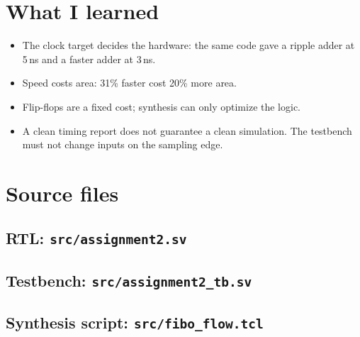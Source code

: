 \documentclass[11pt,a4paper]{article}
\begin{document}
\section{What I learned}
\begin{itemize}
\item The clock target decides the hardware: the same code gave a ripple adder at 5\,ns and a faster adder at 3\,ns.
\item Speed costs area: 31\% faster cost 20\% more area.
\item Flip-flops are a fixed cost; synthesis can only optimize the logic.
\item A clean timing report does not guarantee a clean simulation. The testbench must not change inputs on the sampling edge.
\end{itemize}

\appendix
\section{Source files}
\subsection*{RTL: \texttt{src/assignment2.sv}}

\subsection*{Testbench: \texttt{src/assignment2\_tb.sv}}

\subsection*{Synthesis script: \texttt{src/fibo\_flow.tcl}}

\end{document}
